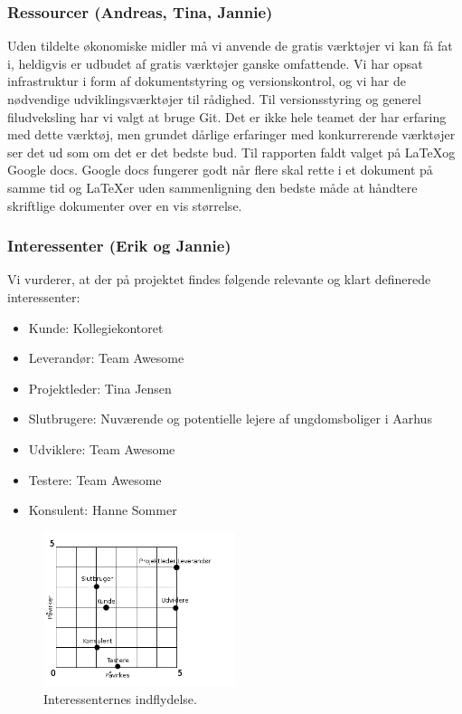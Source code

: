 \documentclass[12pt, a4paper]{report}
\begin{document}
\subsubsection{Ressourcer (Andreas, Tina, Jannie)}
Uden tildelte økonomiske midler må vi anvende de gratis værktøjer vi kan få fat i, heldigvis er udbudet af gratis værktøjer ganske omfattende. Vi har opsat infrastruktur i form af dokumentstyring og versionskontrol, og vi har de nødvendige udviklingsværktøjer til rådighed.
Til versionsstyring og generel filudveksling har vi valgt at bruge Git. Det er ikke hele teamet der har erfaring med dette værktøj, men grundet dårlige erfaringer med konkurrerende værktøjer ser det ud som om det er det bedste bud.
Til rapporten faldt valget på \LaTeX og Google docs. Google docs fungerer godt når flere skal rette i et dokument på samme tid og \LaTeX er uden sammenligning den bedste måde at håndtere skriftlige dokumenter over en vis størrelse.

\subsubsection{Interessenter (Erik og Jannie)}
Vi vurderer, at der på projektet findes følgende relevante og klart definerede interessenter:
\begin{itemize}
\item Kunde: Kollegiekontoret
\item Leverandør: Team Awesome
\item Projektleder: Tina Jensen
\item Slutbrugere: Nuværende og potentielle lejere af ungdomsboliger i Aarhus
\item Udviklere: Team Awesome
\item Testere: Team Awesome
\item Konsulent: Hanne Sommer
\end{itemize}

\begin{figure}[ht!]
\centering
\includegraphics[width=0.5\textwidth]{interessenter}
\caption{Interessenternes indflydelse.}
\end{figure}
\end{document}
